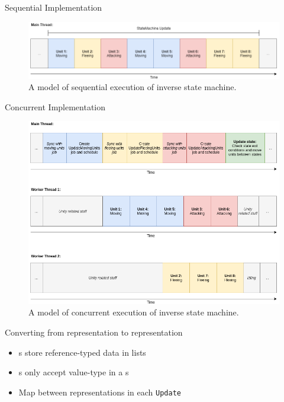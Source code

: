 \begin{frame}{\secname}{\subsecname}
	Sequential Implementation
	\begin{figure}[h!]
        \centering
        \includegraphics[width=\textwidth]{pictures/sequential.png}
        \caption{A model of sequential execution of inverse state machine.}
    \end{figure}
\end{frame}

\begin{frame}{\secname}{\subsecname}
	Concurrent Implementation
	\begin{figure}[h!]
        \centering
        \includegraphics[width=.7\textwidth]{pictures/concurrent.png}
        \caption{A model of concurrent execution of inverse state machine.}
    \end{figure}
\end{frame}

\begin{frame}[fragile]{\secname}{\subsecname}
	Converting from  representation to  representation
	\begin{itemize}
		\item<2-> s store reference-typed data in lists
		\item<3-> s only accept value-type in a s
		\item<4-> Map between representations in each \texttt{Update}
	\end{itemize}
\end{frame}

